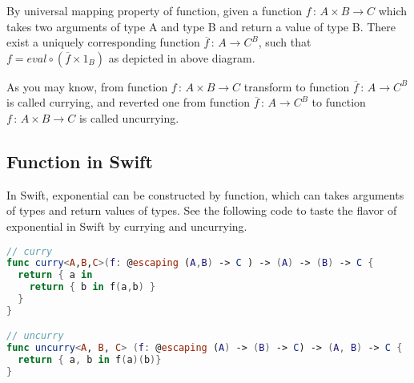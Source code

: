 \documentclass{article}
\begin{document}
By universal mapping property of function, given a function $f\,:\, A \times B \rightarrow C$ which takes two arguments of type A and type B and return a value of type B. There exist a uniquely corresponding function $\overline{f} \, : \, A \rightarrow C^{B}$, such that $ f = eval \circ (\overline{f} \times 1_{B}) $ as depicted in above diagram. 

As you may know, from function $f\,:\, A \times B \rightarrow C$ transform to function $\overline{f} \, : \, A \rightarrow C^{B}$ is called currying, and reverted one from function $\overline{f} \, : \, A \rightarrow C^{B}$ to function $f\,:\, A \times B \rightarrow C$ is called uncurrying.

\subsection*{Function in Swift}
In Swift, exponential can be constructed by function, which can takes arguments of types and return values of types. See the following code to taste the flavor of exponential in Swift by currying and uncurrying.
\begin{lstlisting}[language=Swift]
// curry
func curry<A,B,C>(f: @escaping (A,B) -> C ) -> (A) -> (B) -> C {
  return { a in
    return { b in f(a,b) }
  }
}

// uncurry
func uncurry<A, B, C> (f: @escaping (A) -> (B) -> C) -> (A, B) -> C {
  return { a, b in f(a)(b)}
}
\end{lstlisting}
\end{document}
